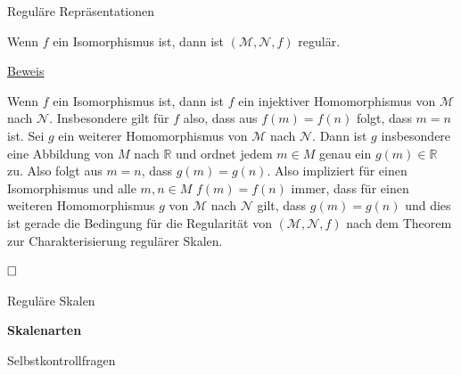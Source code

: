 \documentclass[
  8pt,
  ignorenonframetext,
]{beamer}
\begin{document}
\begin{frame}{Reguläre Repräsentationen}
\protect\hypertarget{reguluxe4re-repruxe4sentationen-6}{}
\small
\begin{theorem}
\justifying
\normalfont
Wenn $f$ ein Isomorphismus ist, dann ist $(\mathcal{M}, \mathcal{N},f)$ regulär.
\end{theorem}

\footnotesize

\underline{Beweis}

Wenn \(f\) ein Isomorphismus ist, dann ist \(f\) ein injektiver
Homomorphismus von \(\mathcal{M}\) nach \(\mathcal{N}\). Insbesondere
gilt für \(f\) also, dass aus \(f(m) = f(n)\) folgt, dass \(m = n\) ist.
Sei \(g\) ein weiterer Homomorphismus von \(\mathcal{M}\) nach
\(\mathcal{N}\). Dann ist \(g\) insbesondere eine Abbildung von \(M\)
nach \(\mathbb{R}\) und ordnet jedem \(m \in M\) genau ein
\(g(m) \in \mathbb{R}\) zu. Also folgt aus \(m = n\), dass
\(g(m) = g(n)\). Also impliziert für einen Isomorphismus und alle
\(m,n \in M\) \(f(m) = f(n)\) immer, dass für einen weiteren
Homomorphismus \(g\) von \(\mathcal{M}\) nach \(\mathcal{N}\) gilt, dass
\(g(m) = g(n)\) und dies ist gerade die Bedingung für die Regularität
von \((\mathcal{M}, \mathcal{N},f)\) nach dem Theorem zur
Charakterisierung regulärer Skalen.

\(\hfill\Box\)
\end{frame}

\begin{frame}{}
\protect\hypertarget{section-4}{}
\vfill
\Large
{}

Reguläre Skalen

\textbf{Skalenarten}

Selbstkontrollfragen \vfill
\end{frame}
\end{document}
